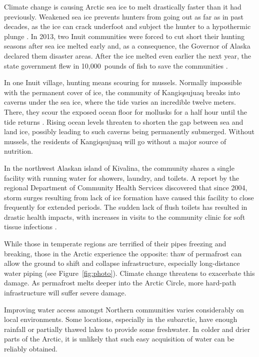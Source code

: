 \documentclass[american]{../../../coursework}
\begin{document}
Climate change is causing Arctic sea ice to melt drastically faster than it
had previously. Weakened sea ice prevents hunters from going out as far as in
past decades, as the ice can crack underfoot and subject the hunter to a
hypothermic plunge \parencite{Brown2011}. In 2013, two Inuit communities were
forced to cut short their hunting seasons after sea ice melted early and, as a
consequence, the Governor of Alaska declared them disaster areas. After the
ice melted even earlier the next year, the state government flew in
10,000~pounds of fish to save the communities \parencite{Struzik2016}.

In one Inuit village, hunting means scouring for mussels. Normally impossible 
with the permanent cover of ice, the community of Kangiqsujuaq breaks into
caverns under the sea ice, where the tide varies an incredible twelve meters.
There, they scour the exposed ocean floor for mollusks for a half hour until
the tide returns \parencite{Brown2011}. Rising ocean levels threaten to
shorten the gap between sea and land ice, possibly leading to such caverns
being permanently submerged. Without mussels, the residents of Kangiqsujuaq
will go without a major source of nutrition.

In the northwest Alaskan island of Kivalina, the community shares a single
facility with running water for showers, laundry, and toilets. A report by the
regional Department of Community Health Services discovered that since 2004,
storm surges resulting from lack of ice formation have caused this facility to
close frequently for extended periods. The sudden lack of flush toilets has
resulted in drastic health impacts, with increases in visits to the community
clinic for soft tissue infections \parencite{Thomas2013}.

While those in temperate regions are terrified of their pipes freezing and
breaking, those in the Arctic experience the opposite: thaw of permafrost can
allow the ground to shift and collapse infrastructure, especially
long-distance water piping (see Figure~\ref{fig:photo}). Climate change
threatens to exacerbate this damage. As permafrost melts deeper into the
Arctic Circle, more hard-path infrastructure will suffer severe damage.

Improving water access amongst Northern communities varies considerably on
local environments. Some locations, especially in the subarctic, have enough
rainfall or partially thawed lakes to provide some freshwater. In colder and
drier parts of the Arctic, it is unlikely that such easy acquisition of water
can be reliably obtained.
\end{document}
